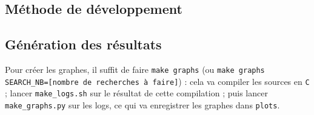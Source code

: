 \documentclass[a4paper, 12pt, twoside]{article}
\begin{document}
\begin{indt}{\section{Méthode de développement}}
        \begin{indt}{\subsection{Génération des résultats}} %
            Pour créer les graphes, il suffit de faire \texttt{make graphs} (ou \texttt{make graphs SEARCH\_NB=[nombre de recherches à faire]}) : cela va compiler les sources en \texttt C ; lancer \texttt{make\_logs.sh} sur le résultat de cette compilation ; puis lancer \texttt{make\_graphs.py} sur les logs, ce qui va enregistrer les graphes dans \texttt{plots}.
        \end{indt} %
    \end{indt}%

    \vspace{12pt}
    
\end{document}
